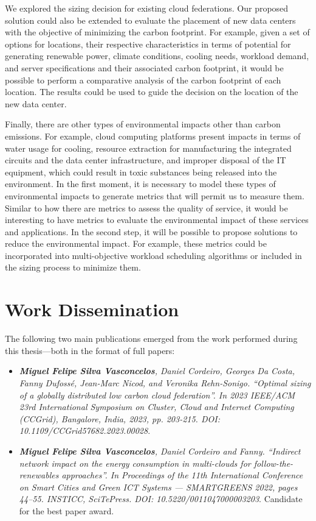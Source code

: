We explored the sizing decision for existing cloud federations. Our proposed solution could also be extended to evaluate the placement of new data centers with the objective of minimizing the carbon footprint. For example, given a set of options for locations, their respective characteristics in terms of potential for generating renewable power, climate conditions, cooling needs, workload demand, and server specifications and their associated carbon footprint, it would be possible to perform a comparative analysis of the carbon footprint of each location. The results could be used to guide the decision on the location of the new data center.

Finally, there are other types of environmental impacts other than carbon emissions. For example, cloud computing platforms present impacts in terms of water usage for cooling, resource extraction for manufacturing the integrated circuits and the data center infrastructure, and improper disposal of the IT equipment, which could result in toxic substances being released into the environment. In the first moment, it is necessary to model these types of environmental impacts to generate metrics that will permit us to measure them. Similar to how there are metrics to assess the quality of service, it would be interesting to have metrics to evaluate the environmental impact of these services and applications. In the second step, it will be possible to propose solutions to reduce the environmental impact. For example, these metrics could be incorporated into multi-objective workload scheduling algorithms or included in the sizing process to minimize them.

\section{Work Dissemination}

\label{sec:conclusion_dissemination}

The following two main publications emerged from the work performed during this thesis---both in the format of full papers:

\begin{itemize}

\item  \textit{\textbf{Miguel Felipe Silva Vasconcelos}, Daniel Cordeiro, Georges Da Costa, Fanny Dufossé, Jean-Marc Nicod, and Veronika Rehn-Sonigo. ``Optimal sizing of a globally distributed low carbon cloud federation''. In 2023 IEEE/ACM 23rd International Symposium on Cluster, Cloud and Internet Computing (CCGrid), Bangalore, India, 2023, pp. 203-215. DOI: 10.1109/CCGrid57682.2023.00028}.
  
\item  \textit{\textbf{Miguel Felipe Silva Vasconcelos}, Daniel Cordeiro and Fanny. ``Indirect network impact on the energy consumption in multi-clouds for follow-the-renewables approaches''. In Proceedings of the 11th International Conference on Smart Cities and Green ICT Systems — SMARTGREENS 2022, pages 44–55. INSTICC, SciTePress. DOI: 10.5220/0011047000003203}. Candidate for the best paper award.

\end{itemize}

